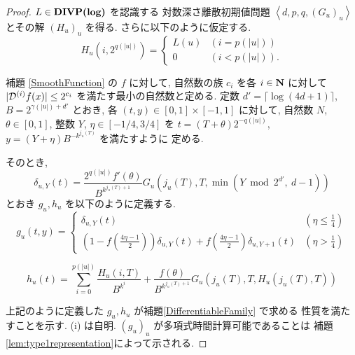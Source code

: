  \begin{proof}
  $L \in \text{\bf DIVP(log)}$ を認識する
  対数深さ離散初期値問題 $\left< d, p, q,(G_u)_u \right>$
  とその解 $(H_u)_u$ を得る. さらに以下のように仮定する.
  \begin{equation}
   H_u(i, 2^{q(|u|)}) = \begin{cases}
			L(u) & (i=p(|u|)) \\
			0 & (i<p(|u|)).
			\end{cases}
  \end{equation}

  補題 \ref{SmoothFunction} の $f$ に対して, 
  自然数の族 $c_i$ を各 $i \in \mathbf N$ に対して 
  $|\mathcal D^{(i)}f(x)| \le 2^{c_i}$ を満たす最小の自然数と定める.
 定数 $d' = \lceil \log (4d + 1) \rceil$, 
 $B = 2^{\gamma(|u|) + d'}$ とおき, 
 各 $(t, y) \in [0,1] \times [-1, 1]$ に対して,
 自然数 $N$, $\theta \in [0,1]$, 整数 $Y$, $\eta \in [-1/4, 3/4]$ を
 $t = (T + \theta)2^{-q(|u|)}$, $y = (Y + \eta)B^{-k^{j_u(T)}}$ を満たすように
 定める.
 
 そのとき,
 \begin{equation}
  \delta_{u, Y} (t) = \frac{2^{q(|u|)} f'(\theta)}{B^{k^{j_u(T)+1}}} 
   G_u\left( j_u(T), T, \min \left(Y \bmod 2^{d'}\!\!\!,\ d-1 \right) \right)
 \end{equation}
 とおき $g_u, h_u$ を以下のように定義する.
 \begin{equation}
  g_u(t,y) 
  = \begin{cases}
     \delta_{u, Y}(t)
     & (\eta \le \frac 1 4)
     \\
     ( 1-f ( \frac{4\eta-1}{2})) \delta_{u, Y}(t) 
     + f ( \frac{4\eta-1}{2}) \delta_{u,Y+1}(t)
     & (\eta > \frac 1 4)
    \end{cases}
 \end{equation}

 \begin{equation} 
  h_u(t) = \sum^{p(|u|)}_{i=0} \frac{H_u(i, T)}{B^{k^i}}  
  + \frac{f(\theta)}{B^{k^{j_u(T)+1}}} G_u(j_u(T), T, H_u(j_u(T), T)) 
  \label{eq:hu}
 \end{equation}

 上記のように定義した $g_u, h_u$ が補題\ref{DifferentiableFamily} で求める
 性質を満たすことを示す. (i) は自明. 
 $(g_u)_u$ が多項式時間計算可能であることは
  補題 \ref{lem:type1representation}によって示される.


\end{proof}
